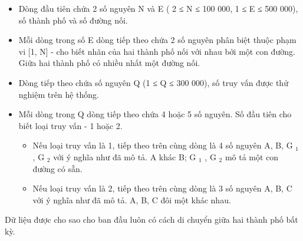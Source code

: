 \begin{itemize}
	\item     Dòng đầu tiên chứa 2 số nguyên N và E ( 2 ≤ N ≤ 100 000, 1 ≤ E ≤ 500 000), số thành phố và số đường nối.   
	\item     Mỗi dòng trong số E dòng tiếp theo chứa 2 số nguyên phân biệt thuộc phạm vi [1, N] - cho biết nhãn của hai thành phố nối với nhau bởi một con đường. Giữa hai thành phố có nhiều nhất một đường nối.   
	\item     Dòng tiếp theo chứa số nguyên Q (1 ≤ Q ≤ 300 000), số truy vấn được thử nghiệm trên hệ thống.   
	\item     Mỗi dòng trong Q dòng tiếp theo chứa 4 hoặc 5 số nguyên. Số đầu tiên cho biết loại truy vấn - 1 hoặc 2.    
\begin{itemize}
	\item       Nếu loại truy vấn là 1, tiếp theo trên cùng dòng là 4 số nguyên A, B, G      $_       1      $      , G      $_       2      $      với ý nghĩa như đã mô tả. A khác B; G      $_       1      $      , G      $_       2      $      mô tả một con đường có   sẵn.     
	\item       Nếu loại truy vấn là 2, tiếp theo trên cùng dòng là 3 số nguyên A, B, C với ý nghĩa như đã mô tả. A, B, C đôi một khác nhau.     
\end{itemize}
\end{itemize}

   Dữ liệu được cho sao cho ban đầu luôn có cách di chuyển giữa hai thành phố bất kỳ.  

\